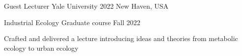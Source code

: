 

\begin{cventries}

  \cventry
    {Guest Lecturer} %
    {Yale University} %
    {2022} %
    {New Haven, USA} %
    {
      \begin{cvsubentries}
       \cvsubentry
         {Industrial Ecology}
         {\footnotesize Graduate course}
         {Fall 2022}
         {
         \begin{cvitems}
          \item Crafted and delivered a lecture introducing ideas and theories from metabolic ecology to urban ecology
         \end{cvitems} 
         }
      \end{cvsubentries}
    }


\end{cventries}
